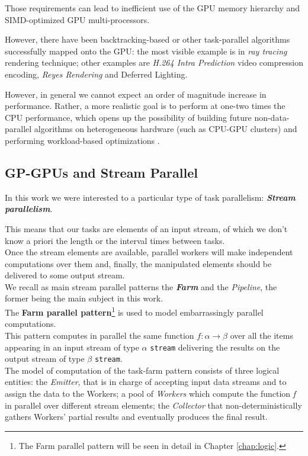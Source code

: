 	Those requirements can lead to inefficient use of the GPU memory hierarchy and SIMD-optimized GPU multi-processors.
	
	However, there have been backtracking-based or other task-parallel algorithms successfully mapped onto the GPU: the most visible example is in \textit{ray tracing} rendering technique; other examples are \textit{H.264 Intra Prediction} video compression encoding, \textit{Reyes Rendering} and Deferred Lighting.
		
	However, in general we cannot expect an order of magnitude increase in performance. Rather, a more realistic goal is to perform at one-two times the CPU performance, which opens up the possibility of building future non-data-parallel algorithms on heterogeneous hardware (such as CPU-GPU clusters) and performing workload-based optimizations	\cite{backtrack}.
 

\subsection{GP-GPUs and Stream Parallel}
\label{subs:gpgpustreampar}
	In this work we were interested to a particular type of task parallelism:
	\textbf{\textit{Stream parallelism}}.
	
	This means that our tasks are elements of an input stream, of which we don't know a priori the length or the interval times between tasks.\\
	Once the stream elements are available, parallel workers will make independent computations over them and, finally, the manipulated elements should be delivered to some output stream.\\
	We recall as main stream parallel patterns the \textbf{\textit{Farm}} and the \textit{Pipeline}, the former being the main subject in this work.\\
	
	The \textbf{Farm parallel pattern}\footnote{The Farm parallel pattern will be seen in detail in Chapter \ref{chap:logic}.} is used to model embarrassingly parallel computations. \\
	
	This pattern computes in parallel the same  function \(f:\alpha\rightarrow\beta\) over all the items  appearing in an input stream of type \(\alpha\) \texttt{stream} delivering the results on the output stream of type \(\beta\) \texttt{stream}.\\
	The model of computation of the task-farm pattern consists of three logical entities:  the \textit{Emitter}, that is in charge of accepting input data streams and to assign the data to the Workers; a pool of \textit{Workers} which compute the function \textit{f} in  parallel over different stream elements; the \textit{Collector} that non-deterministically  gathers Workers' partial results and  eventually produces the final result.\\
	
